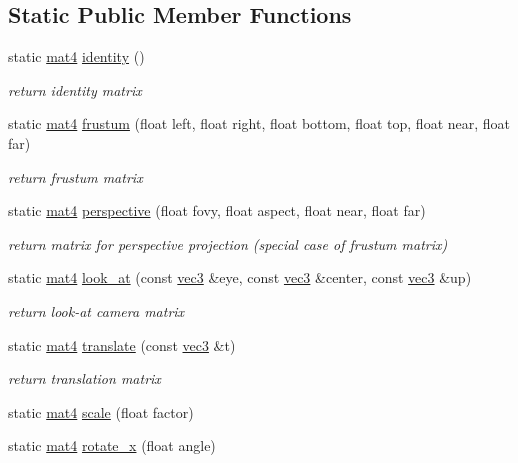 \subsection*{Static Public Member Functions}
\begin{DoxyCompactItemize}
\item 
static \hyperlink{classmat4}{mat4} \hyperlink{classmat4_af4dd10f9a4c0515cb66d3d7a92315360}{identity} ()
\begin{DoxyCompactList}\small\item\em return identity matrix \end{DoxyCompactList}\item 
static \hyperlink{classmat4}{mat4} \hyperlink{classmat4_a1bd4dba30f944942b922dc765a0f2b49}{frustum} (float left, float right, float bottom, float top, float near, float far)
\begin{DoxyCompactList}\small\item\em return frustum matrix \end{DoxyCompactList}\item 
static \hyperlink{classmat4}{mat4} \hyperlink{classmat4_a531453b6a6c5cf8df9057ee2624c217a}{perspective} (float fovy, float aspect, float near, float far)
\begin{DoxyCompactList}\small\item\em return matrix for perspective projection (special case of frustum matrix) \end{DoxyCompactList}\item 
static \hyperlink{classmat4}{mat4} \hyperlink{classmat4_a43fd28c811abea786299cbf0551b2254}{look\+\_\+at} (const \hyperlink{classvec3}{vec3} \&eye, const \hyperlink{classvec3}{vec3} \&center, const \hyperlink{classvec3}{vec3} \&up)
\begin{DoxyCompactList}\small\item\em return look-\/at camera matrix \end{DoxyCompactList}\item 
static \hyperlink{classmat4}{mat4} \hyperlink{classmat4_aaa01f2d513fd6ff553c8b8409c5db648}{translate} (const \hyperlink{classvec3}{vec3} \&t)
\begin{DoxyCompactList}\small\item\em return translation matrix \end{DoxyCompactList}\item 
static \hyperlink{classmat4}{mat4} \hyperlink{classmat4_a634346eae7a482a482a26e6b9759078d}{scale} (float factor)
\item 
static \hyperlink{classmat4}{mat4} \hyperlink{classmat4_aaa2347aa6162f402adefa37129762a23}{rotate\+\_\+x} (float angle)

\end{DoxyCompactItemize}
